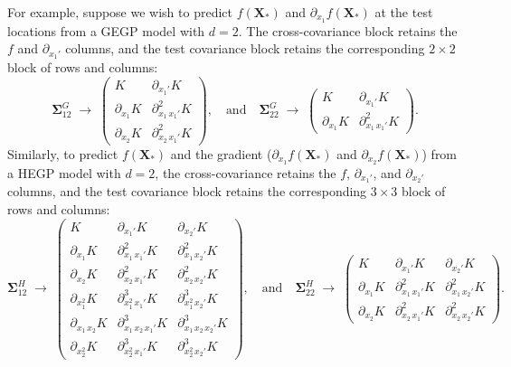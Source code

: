 \documentclass[12pt]{article}
\begin{document}
For example, suppose we wish to predict $f(\mathbf{X}_*)$ and $\partial_{x_1} f(\mathbf{X}_*)$ at the test locations from a GEGP model with $d=2$. The cross-covariance block retains the $f$ and $\partial_{x_1'}$ columns, and the test covariance block retains the corresponding $2 \times 2$ block of rows and columns:
\begin{equation}
	\boldsymbol{\Sigma}_{12}^{G} \;\longrightarrow\;
	\begin{pmatrix}
		K & \partial_{x_1'} K \\
		\partial_{x_1} K & \partial^2_{x_1\,x_1'} K \\
		\partial_{x_2} K & \partial^2_{x_2\,x_1'} K
	\end{pmatrix}, \quad \text{and} \quad
	\boldsymbol{\Sigma}_{22}^{G} \;\longrightarrow\;
	\begin{pmatrix}
		K & \partial_{x_1'} K \\
		\partial_{x_1} K & \partial^2_{x_1\,x_1'} K
	\end{pmatrix}.
\end{equation}
Similarly, to predict $f(\mathbf{X}_*)$ and the gradient ($\partial_{x_1} f(\mathbf{X}_*)$ and $\partial_{x_2} f(\mathbf{X}_*)$) from a HEGP model with $d=2$, the cross-covariance retains the $f$, $\partial_{x_1'}$, and $\partial_{x_2'}$ columns, and the test covariance block retains the corresponding $3 \times 3$ block of rows and columns:
\begin{equation}
	\boldsymbol{\Sigma}_{12}^{H} \;\longrightarrow\;
	\begin{pmatrix}
		K & \partial_{x_1'} K & \partial_{x_2'} K \\
		\partial_{x_1} K & \partial^2_{x_1\,x_1'} K & \partial^2_{x_1\,x_2'} K \\
		\partial_{x_2} K & \partial^2_{x_2\,x_1'} K & \partial^2_{x_2\,x_2'} K \\
		\partial_{x_1^2} K & \partial^3_{x_1^2\,x_1'} K & \partial^3_{x_1^2\,x_2'} K \\
		\partial_{x_1\,x_2} K & \partial^3_{x_1\,x_2\,x_1'} K & \partial^3_{x_1\,x_2\,x_2'} K \\
		\partial_{x_2^2} K & \partial^3_{x_2^2\,x_1'} K & \partial^3_{x_2^2\,x_2'} K
	\end{pmatrix}, \quad \text{and} \quad
	\boldsymbol{\Sigma}_{22}^{H} \;\longrightarrow\;
	\begin{pmatrix}
		K & \partial_{x_1'} K & \partial_{x_2'} K \\
		\partial_{x_1} K & \partial^2_{x_1\,x_1'} K & \partial^2_{x_1\,x_2'} K \\
		\partial_{x_2} K & \partial^2_{x_2\,x_1'} K & \partial^2_{x_2\,x_2'} K
	\end{pmatrix}.
\end{equation}
\end{document}
